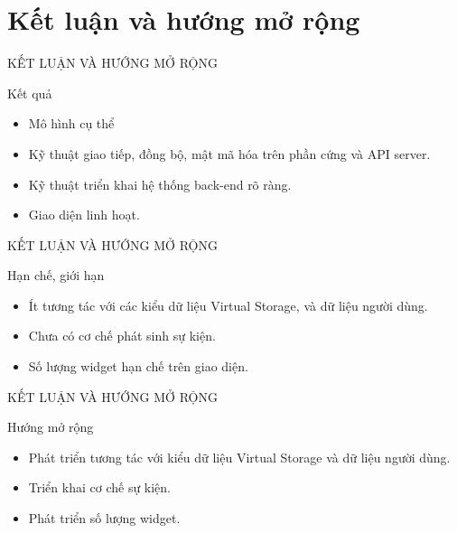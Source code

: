 \section{Kết luận và hướng mở rộng}
\begin{frame}{KẾT LUẬN VÀ HƯỚNG MỞ RỘNG}
    \begin{mybox}[blue]{Kết quả}
		\begin{itemize}
			\item Mô hình cụ thể
			\item Kỹ thuật giao tiếp, đồng bộ, mật mã hóa trên phần cứng và API server.
			\item Kỹ thuật triển khai hệ thống back-end rõ ràng.
			\item Giao diện linh hoạt.
		\end{itemize}
	\end{mybox}
\end{frame}

\begin{frame}{KẾT LUẬN VÀ HƯỚNG MỞ RỘNG}
	\begin{mybox}[yellow]{Hạn chế, giới hạn}
		\begin{itemize}
			\item Ít tương tác với các kiểu dữ liệu Virtual Storage, và dữ liệu người dùng.
			\item Chưa có cơ chế phát sinh sự kiện.
			\item Số lượng widget hạn chế trên giao diện.
		\end{itemize}
	\end{mybox}
\end{frame}

\begin{frame}{KẾT LUẬN VÀ HƯỚNG MỞ RỘNG}
	\begin{mybox}[green]{Hướng mở rộng}
		\begin{itemize}
			\item Phát triển tương tác với kiểu dữ liệu Virtual Storage và dữ liệu người dùng.
			\item Triển khai cơ chế sự kiện.
			\item Phát triển số lượng widget.
		\end{itemize}
	\end{mybox}
\end{frame}
